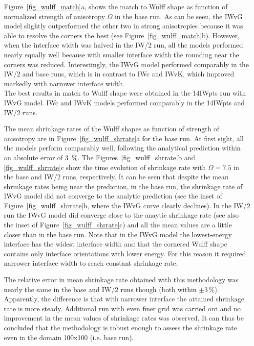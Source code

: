 Figure~\ref{fig_wulff_match}a, shows the match to Wulff shape as function of normalized strength of anisotropy $\Omega$ in the base run. As can be seen, the IWvG model slightly outperformed the other two in strong anisotropies because it was able to resolve the corners the best (see Figure~\ref{fig_wulff_match}b). However, when the interface width was halved in the IW/2 run, all the models performed nearly equally well because with smaller interface width the rounding near the corners was reduced. Interestingly, the IWvG model performed comparably in the IW/2 and base runs, which is in contrast to IWc and IWvK, which improved markedly with narrower interface width. \\
The best results in match to Wulff shape were obtained in the 14IWpts run with IWvG model. IWc and IWvK models performed comparably in the 14IWpts and IW/2 runs.

The mean shrinkage rates of the Wulff shapes as function of strength of anisotropy are in Figure~\ref{fig_wulff_shrrate}a for the base run. At first sight, all the models perform comparably well, following the analytical prediction within an absolute error of 3~\%. The Figures~\ref{fig_wulff_shrrate}b and \ref{fig_wulff_shrrate}c show the time evolution of shrinkage rate with $\Omega=7.5$ in the base and IW/2 runs, respectively. It can be seen that despite the mean shrinkage rates being near the prediction, in the base run, the shrinkage rate of IWvG model did not converge to the analytic prediction (see the inset of Figure~\ref{fig_wulff_shrrate}b, where the IWvG curve clearly declines). In the IW/2 run the IWvG model did converge close to the anaytic shrinkage rate (see also the inset of Figure~\ref{fig_wulff_shrrate}c) and all the mean values are a little closer than in the base run. Note that in the IWvG model the lowest-energy interface has the widest interface width and that the cornered Wulff shape contains only interface orientations with lower energy. For this reason it required narrower interface width to reach constant shrinkage rate.

The relative error in mean shrinkage rate obtained with this methodology was nearly the same in the base and IW/2 runs though (both within $\pm3\,\%$). Apparently, the difference is that with narrower interface the attained shrinkage rate is more steady. Additional run with even finer grid was carried out and no improvement in the mean values of shrinkage rates was observed. It can thus be concluded that the methodology is robust enough to assess the shrinkage rate even in the domain 100x100 (i.e. base run).

